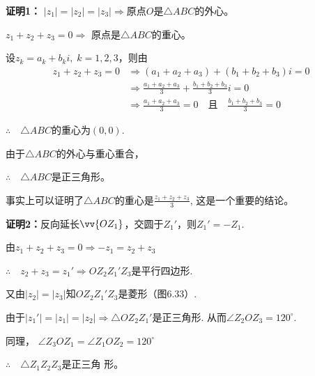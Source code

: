 \textbf{证明1：}
$|z_1|=|z_2|=|z_3|\Rightarrow $原点$O$是$\triangle ABC$的外心。

$z_1+z_2+z_3=0\Rightarrow $
原点是$\triangle ABC$的重心。

设$z_k=a_k+b_k i,\; k=1,2,3$，则由
\[\begin{split}
    z_1+z_2+z_3=0 &\Rightarrow (a_1+a_2+a_3)+(b_1+b_2+b_3)i=0\\
    &\Rightarrow \frac{a_1+a_2+a_3}{3}+\frac{b_1+b_2+b_3}{3}i=0\\
    &\Rightarrow \frac{a_1+a_2+a_3}{3}=0\quad \text{且}\quad \frac{b_1+b_2+b_3}{3}=0
\end{split}\]

$\therefore\quad \triangle ABC$的重心为$(0,0)$.

由于$\triangle ABC$的外心与重心重合，

$\therefore\quad \triangle ABC$是正三角形。

\begin{rmk}
    事实上可以证明了$\triangle ABC$的重心是$\frac{z_1+z_2+z_3}{3}$, 
这是一个重要的结论。
\end{rmk}

\noindent
\begin{minipage}{.55\textwidth}\CTEXindent
    \textbf{证明2：}反向延长$\vv{OZ_1}$，交圆于$Z_1'$，则$Z_1'=-Z_1$.

由$z_1+z_2+z_3=0\Rightarrow -z_1=z_2+z_3$

$\therefore\quad z_2+z_3=z_1'\Rightarrow OZ_2Z_1'Z_3$是平行四边形.
    
又由$|z_2|=|z_3|$知$OZ_2Z_1'Z_3$是菱形（图6.33）.

由于$|z_1'|=|z_1|=|z_2|\Rightarrow \triangle OZ_2Z_1'$是正三角形.
从而$\angle Z_2OZ_3=120^{\circ}$. 

同理，
$\angle Z_3 OZ_1=\angle Z_1OZ_2=120^{\circ}$

$\therefore\quad \triangle Z_1Z_2Z_3$是正三角
形。
\end{minipage}
\hfill
\begin{minipage}{.4\textwidth}
\centering
{}
\end{minipage}

